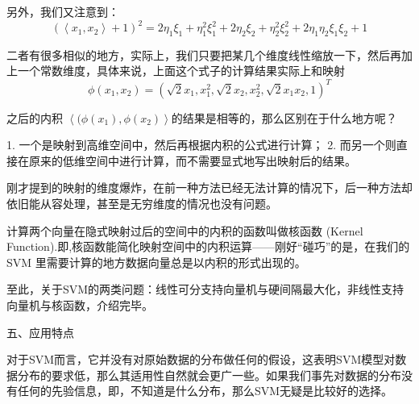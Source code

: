 \documentclass[UTF8]{article}
\begin{document}
 
 另外，我们又注意到：
 \begin{equation}
 (\left\langle x_1,x_2\right\rangle+1)^2=2\eta_1\xi_1+\eta_1^2\xi_1^2+2\eta_2\xi_2+\eta_2^2\xi_2^2+2\eta_1\eta_2\xi_1\xi_2+1
 \end{equation}
  
 二者有很多相似的地方，实际上，我们只要把某几个维度线性缩放一下，然后再加上一个常数维度，具体来说，上面这个式子的计算结果实际上和映射
 \begin{equation}
 	\phi(x_1,x_2) = (\sqrt{2}x_1,x_1^2,\sqrt{2}x_2,x_2^2,\sqrt{2}x_1x_2,1)^T
 \end{equation}

 之后的内积 $\left\langle(\phi(x_1),\phi(x_2)\right\rangle$的结果是相等的，那么区别在于什么地方呢？
 
 1.	一个是映射到高维空间中，然后再根据内积的公式进行计算；
 2.	而另一个则直接在原来的低维空间中进行计算，而不需要显式地写出映射后的结果。
 
 
 刚才提到的映射的维度爆炸，在前一种方法已经无法计算的情况下，后一种方法却依旧能从容处理，甚至是无穷维度的情况也没有问题。
 
 计算两个向量在隐式映射过后的空间中的内积的函数叫做核函数 (Kernel Function).即,核函数能简化映射空间中的内积运算——刚好“碰巧”的是，在我们的SVM 里需要计算的地方数据向量总是以内积的形式出现的。
 
 至此，关于SVM的两类问题：线性可分支持向量机与硬间隔最大化，非线性支持向量机与核函数，介绍完毕。
 
 
 五、应用特点
 
 对于SVM而言，它并没有对原始数据的分布做任何的假设，这表明SVM模型对数据分布的要求低，那么其适用性自然就会更广一些。如果我们事先对数据的分布没有任何的先验信息，即，不知道是什么分布，那么SVM无疑是比较好的选择。
 
\end{document}
